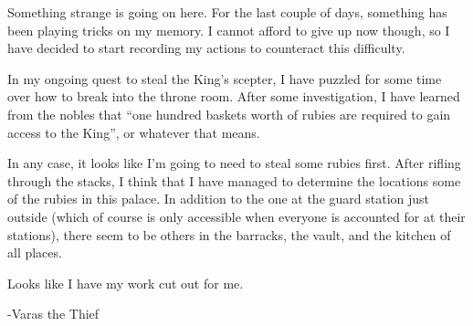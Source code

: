 \documentclass[white]{grimrock}
\begin{document}
\name{\wArchives{}}

Something strange is going on here. For the last couple of days, something has been playing tricks on my memory. I cannot afford to give up now though, so I have decided to start recording my actions to counteract this difficulty.

In my ongoing quest to steal the King's scepter, I have puzzled for some time over how to break into the throne room. After some investigation, I have learned from the nobles that ``one hundred baskets worth of rubies are required to gain access to the King'', or whatever that means.

In any case, it looks like I'm going to need to steal some rubies first. After rifling through the stacks, I think that I have managed to determine the locations some of the rubies in this palace. In addition to the one at the guard station just outside (which of course is only accessible when everyone is accounted for at their stations), there seem to be others in the barracks, the vault, and the kitchen of all places.

Looks like I have my work cut out for me.

								-Varas the Thief
\end{document}
